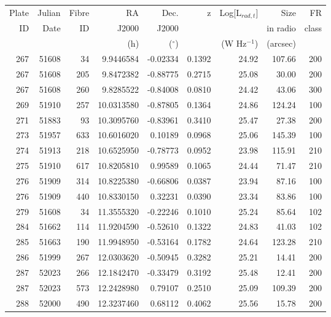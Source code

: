 \documentclass[usenatbib]{mn2e}
\begin{document}
\begin{table*}

\begin{tabular}{rrrrrrrrr}
\hline
Plate & Julian & Fibre & RA      & Dec.        & z &  Log[L$_{rad,t}$]& Size         &  FR     \\
ID    & Date   & ID    &  J2000  &  J2000      &   &                  &  in radio       &  class   \\
      &        &       & (h)     & ($^{\circ}$)&   &  (W Hz$^{-1}$)   & (arcsec)     &          \\    
\hline 

267 & 51608 & 34 & 9.9446584 & -0.02334 & 0.1392 & 24.92 & 107.66 & 200 \\
267 & 51608 & 205 & 9.8472382 & -0.88775 & 0.2715 & 25.08 & 30.00 & 200 \\
267 & 51608 & 260 & 9.8285522 & -0.84008 & 0.0810 & 24.42 & 43.06 & 300 \\
269 & 51910 & 257 & 10.0313580 & -0.87805 & 0.1364 & 24.86 & 124.24 & 100 \\
271 & 51883 & 93 & 10.3095760 & -0.83961 & 0.3410 & 25.47 & 27.38 & 200 \\
273 & 51957 & 633 & 10.6016020 & 0.10189 & 0.0968 & 25.06 & 145.39 & 100 \\
274 & 51913 & 218 & 10.6525950 & -0.78773 & 0.0952 & 23.98 & 115.91 & 210 \\
275 & 51910 & 617 & 10.8205810 & 0.99589 & 0.1065 & 24.44 & 71.47 & 210 \\
276 & 51909 & 314 & 10.8225380 & -0.66806 & 0.0387 & 23.94 & 87.16 & 100 \\
276 & 51909 & 440 & 10.8330150 & 0.32231 & 0.0390 & 23.34 & 83.86 & 100 \\
279 & 51608 & 34 & 11.3555320 & -0.22246 & 0.1010 & 25.24 & 85.64 & 102 \\
284 & 51662 & 114 & 11.9204590 & -0.52610 & 0.1322 & 24.83 & 41.03 & 102 \\
285 & 51663 & 190 & 11.9948950 & -0.53164 & 0.1782 & 24.64 & 123.28 & 210 \\
286 & 51999 & 267 & 12.0303620 & -0.50945 & 0.3282 & 25.21 & 14.41 & 200 \\
287 & 52023 & 266 & 12.1842470 & -0.33479 & 0.3192 & 25.48 & 12.41 & 200 \\
287 & 52023 & 573 & 12.2428980 & 0.79107 & 0.2510 & 25.09 & 109.39 & 200 \\
288 & 52000 & 490 & 12.3237460 & 0.68112 & 0.4062 & 25.56 & 15.78 & 200 \\

\end{tabular}
\end{table*}
\end{document}
